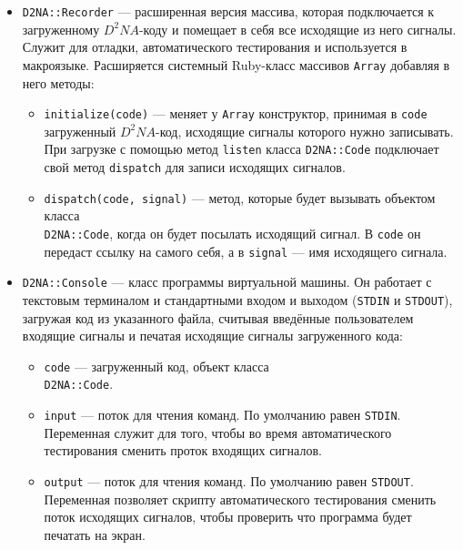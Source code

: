 \documentclass[utf8,a5paper,portrait,10pt,twoside]{eskdtext}
\begin{document}
\begin{itemize}
\begin{itemize}
        \end{itemize}
  \item \texttt{D2NA::Recorder} — расширенная версия массива, которая
        подключается к загруженному $D^2NA$-коду и помещает в себя все
        исходящие из него сигналы. Служит для отладки, автоматического
        тестирования и используется в макроязыке. Расширяется системный
        Ruby-класс массивов \texttt{Array} добавляя в него методы:
       \begin{itemize}
          \item \texttt{initialize(code)} — меняет у \texttt{Array}
                конструктор, принимая в \texttt{code} загруженный $D^2NA$-код,
                исходящие сигналы которого нужно записывать. При загрузке
                с помощью метод \texttt{listen} класса \texttt{D2NA::Code}
                подключает свой метод \texttt{dispatch} для записи исходящих
                сигналов.
          \item \texttt{dispatch(code, signal)} — метод, которые будет вызывать
                объектом класса \\ \texttt{D2NA::Code}, когда он будет посылать
                исходящий сигнал. В \texttt{code} он передаст ссылку на самого
                себя, а в \texttt{signal} — имя исходящего сигнала.
        \end{itemize}
  \item \texttt{D2NA::Console} — класс программы виртуальной машины. Он
        работает с текстовым терминалом и стандартными входом и выходом
        (\texttt{STDIN} и \texttt{STDOUT}), загружая код из указанного файла,
        считывая введённые пользователем входящие сигналы и печатая исходящие
        сигналы загруженного кода:
        \begin{itemize}
          \item \texttt{code} — загруженный код, объект класса\\
                \texttt{D2NA::Code}.
          \item \texttt{input} — поток для чтения команд. По умолчанию равен
                \texttt{STDIN}. Переменная служит для того, чтобы во время
                автоматического тестирования сменить проток входящих сигналов.
          \item \texttt{output} — поток для чтения команд. По умолчанию равен
                \texttt{STDOUT}. Переменная позволяет скрипту автоматического
                тестирования сменить поток исходящих сигналов, чтобы проверить
                что программа будет печатать на экран.

\end{itemize}
\end{itemize}
\end{document}
